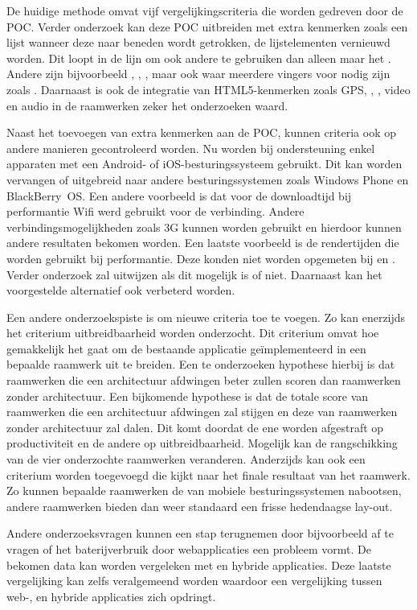De huidige methode omvat vijf vergelijkingscriteria die worden gedreven door de POC.
Verder onderzoek kan deze POC uitbreiden met extra kenmerken zoals een lijst wanneer deze naar beneden wordt getrokken, de lijstelementen vernieuwd worden.
Dit loopt in de lijn om ook andere  te gebruiken dan alleen maar het  .
Andere  zijn bijvoorbeeld , , , maar ook  waar meerdere vingers voor nodig zijn zoals .
Daarnaast is ook de integratie van HTML5-kenmerken zoals GPS, , , video en audio in de raamwerken zeker het onderzoeken waard.

Naast het toevoegen van extra kenmerken aan de POC, kunnen criteria ook op andere manieren gecontroleerd worden.
Nu worden bij ondersteuning enkel apparaten met een Android- of iOS-besturingssysteem gebruikt.
Dit kan worden vervangen of uitgebreid naar andere besturingssystemen zoals Windows Phone en BlackBerry~OS.
Een andere voorbeeld is dat voor de downloadtijd bij performantie Wifi werd gebruikt voor de verbinding.
Andere verbindingsmogelijkheden zoals 3G kunnen worden gebruikt en hierdoor kunnen andere resultaten bekomen worden.
Een laatste voorbeeld is de rendertijden die worden gebruikt bij performantie.
Deze konden niet worden opgemeten bij \st{} en \lungo{}.
Verder onderzoek zal uitwijzen als dit mogelijk is of niet.
Daarnaast kan het voorgestelde alternatief ook verbeterd worden.

Een andere onderzoekspiste is om nieuwe criteria toe te voegen.
Zo kan enerzijds het criterium uitbreidbaarheid worden onderzocht.
Dit criterium omvat hoe gemakkelijk het gaat om de bestaande applicatie geïmplementeerd in een bepaalde raamwerk uit te breiden.
Een te onderzoeken hypothese hierbij is dat raamwerken die een architectuur afdwingen beter zullen scoren dan raamwerken zonder architectuur.
Een bijkomende hypothese is dat de totale score van raamwerken die een architectuur afdwingen zal stijgen en deze van raamwerken zonder architectuur zal dalen.
Dit komt doordat de ene worden afgestraft op productiviteit en de andere op uitbreidbaarheid.
Mogelijk kan de rangschikking van de vier onderzochte raamwerken veranderen.
Anderzijds kan ook een criterium worden toegevoegd die kijkt naar het finale resultaat van het raamwerk.
Zo kunnen bepaalde raamwerken de  van mobiele besturingssystemen  nabootsen, andere raamwerken bieden dan weer standaard een frisse hedendaagse lay-out.

Andere onderzoeksvragen kunnen een stap terugnemen door bijvoorbeeld af te vragen of het baterijverbruik door webapplicaties een probleem vormt.
De bekomen data kan worden vergeleken met  en hybride applicaties.
Deze laatste vergelijking kan zelfs veralgemeend worden waardoor een vergelijking tussen web-,  en hybride applicaties zich opdringt. 



